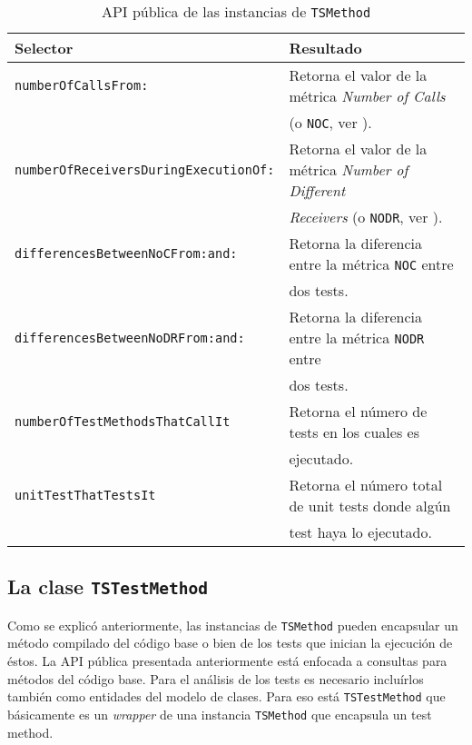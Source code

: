 \begin{table}[h] 
    \centering 
    \begin{tabular}{|l|l|}
    	\hline
\textbf{Selector} & \textbf{Resultado} \\ \hline \hline

{\tt numberOfCallsFrom: } & Retorna el valor de la métrica \emph{Number of Calls}\\
						& (o {\tt NOC}, ver \secref{viz-metricas}). \\ \hline
{\tt numberOfReceiversDuringExecutionOf:} & Retorna el valor de la métrica \emph{Number of Different}  \\ 
						&\emph{Receivers} (o {\tt NODR}, ver \secref{viz-metricas}). \\ \hline
{\tt differencesBetweenNoCFrom:and:}	& Retorna la diferencia entre la métrica {\tt NOC} entre\\
						&  dos tests. \\ \hline
{\tt differencesBetweenNoDRFrom:and:} & Retorna la diferencia entre la métrica {\tt NODR}  entre\\
						&  dos tests. \\ \hline
{\tt numberOfTestMethodsThatCallIt} & Retorna el número de tests en los cuales es  \\ 
						& ejecutado.\\ \hline
{\tt unitTestThatTestsIt} & Retorna el número total de unit tests donde algún  \\ 
						& test haya lo ejecutado. \\ \hline						
    \end{tabular}
    \caption{API pública de las instancias de {\tt TSMethod}}
\end{table} 


\subsection{La clase {\tt TSTestMethod} }
\par Como se explicó anteriormente, las instancias de {\tt TSMethod} pueden encapsular un método compilado del código base o bien de los tests que inician la ejecución de éstos. La API pública presentada anteriormente está enfocada a consultas para métodos del código base. Para el análisis de los tests es necesario incluírlos también como entidades del modelo de clases. Para eso está {\tt TSTestMethod} que básicamente es un \emph{wrapper} de una instancia {\tt TSMethod} que encapsula un test method.

